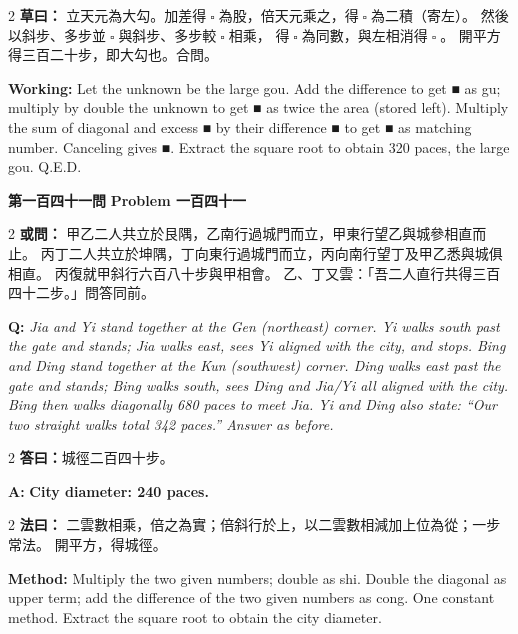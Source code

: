 \documentclass[11pt,a4paper]{article}
\let\origsquare\square
\renewcommand{\square}{\ensuremath{\origsquare}}%
\newcommand{\wen}[1]{%
  \par\vspace{0.5em}%
  \noindent\textcolor{problemcolor}{\textbf{第#1問}}%
  \hfill\textcolor{problemcolor}{\textbf{Problem #1}}\par\nopagebreak%
  \vspace{0.3em}%
}
\newcommand{\owen}[1]{%
  \noindent\textcolor{problemcolor}{\textbf{或問：}}{\tradfont #1}\par\nopagebreak%
}
\newcommand{\oweneng}[1]{%
  \noindent\textcolor{engcolor}{\textbf{Q: }}{\itshape #1}\par\nopagebreak%
}
\newcommand{\fayue}[1]{%
  \noindent\textcolor{methodcolor}{\textbf{法曰：}}{\tradfont #1}\par\nopagebreak%
}
\newcommand{\fayueeng}[1]{%
  \noindent\textcolor{engcolor}{\textbf{Method: }}{#1}\par\nopagebreak%
}
\newcommand{\tsaoyue}[1]{%
  \noindent\textcolor{workcolor}{\textbf{草曰：}}{\tradfont #1}\par%
}
\newcommand{\tsaoyueeng}[1]{%
  \noindent\textcolor{engcolor}{\textbf{Working: }}{\small #1}\par%
}
\newcommand{\dayue}[1]{%
  \noindent\textcolor{anscolor}{\textbf{答曰：}}{\tradfont #1}\par\nopagebreak%
}
\newcommand{\dayueeng}[1]{%
  \noindent\textcolor{engcolor}{\textbf{A: }}{\bfseries #1}\par\nopagebreak%
}
\begin{document}
\begin{paracol}{2}
\tsaoyue{%
立天元為大勾。加差得$ \; \square \; $為股，倍天元乘之，得$ \; \square \; $為二積（寄左）。
然後以斜步、多步並$ \; \square \; $與斜步、多步較$ \; \square \; $相乘，
得$ \; \square \; $為同數，與左相消得$ \; \square \; $。
開平方得三百二十步，即大勾也。合問。}
\switchcolumn
\tsaoyueeng{%
Let the unknown be the large gou. Add the difference to get ■ as gu; multiply by double the unknown to get ■ as twice the area (stored left). Multiply the sum of diagonal and excess ■ by their difference ■ to get ■ as matching number. Canceling gives ■. Extract the square root to obtain 320 paces, the large gou. Q.E.D.}
\end{paracol}

\vspace{0.5cm}

\wen{一百四十一}

\begin{paracol}{2}
\owen{%
甲乙二人共立於艮隅，乙南行過城門而立，甲東行望乙與城參相直而止。
丙丁二人共立於坤隅，丁向東行過城門而立，丙向南行望丁及甲乙悉與城俱相直。
丙復就甲斜行六百八十步與甲相會。
乙、丁又雲：「吾二人直行共得三百四十二步。」問答同前。}
\switchcolumn
\oweneng{%
Jia and Yi stand together at the Gen (northeast) corner. Yi walks south past the gate and stands; Jia walks east, sees Yi aligned with the city, and stops. Bing and Ding stand together at the Kun (southwest) corner. Ding walks east past the gate and stands; Bing walks south, sees Ding and Jia/Yi all aligned with the city. Bing then walks diagonally 680 paces to meet Jia. Yi and Ding also state: ``Our two straight walks total 342 paces.'' Answer as before.}
\end{paracol}

\begin{paracol}{2}
\dayue{城徑二百四十步。}
\switchcolumn
\dayueeng{City diameter: 240 paces.}
\end{paracol}

\begin{paracol}{2}
\fayue{%
二雲數相乘，倍之為實；倍斜行於上，以二雲數相減加上位為從；一步常法。
開平方，得城徑。}
\switchcolumn
\fayueeng{%
Multiply the two given numbers; double as shi. Double the diagonal as upper term; add the difference of the two given numbers as cong. One constant method. Extract the square root to obtain the city diameter.}
\end{paracol}
\end{document}
